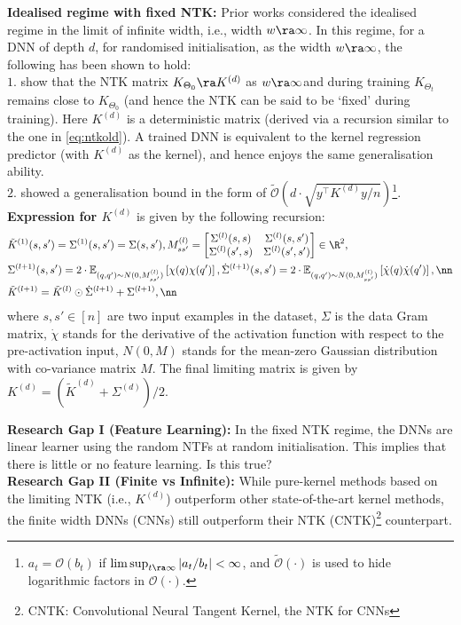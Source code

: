 \textbf{Idealised regime with fixed NTK:}
Prior works considered the idealised regime in the limit of infinite width, i.e., width $w\ra\infty$. In this regime, for a DNN of depth $d$, for randomised initialisation, as the width $w\ra\infty$, the following has been shown to hold:\\
$1.$ \cite{arora2019exact} show that the NTK matrix $K_{\Theta_0}\ra K^{(d)}$ as $w\ra\infty$and during training $K_{\Theta_t}$ remains close to $K_{\Theta_0}$ (and hence the NTK can be said to be `fixed' during training). Here $K^{(d)}$ is a deterministic matrix (derived via a recursion similar to the one in \eqref{eq:ntkold}). A trained DNN is equivalent to the kernel regression predictor (with $K^{(d)}$ as the kernel), and hence enjoys the same generalisation ability.\\
$2.$  \cite{cao2019generalization} showed a generalisation bound in the form of $\tilde{\mathcal{O}}\left(d\cdot\sqrt{y^\top K^{(d)} y/n}\right)$\footnote{$a_t=\mathcal{O}(b_t)$ if $\lim\sup_{t\ra\infty}|a_t/b_t|<\infty$, and $\tilde{\mathcal{O}}(\cdot)$ is used to hide logarithmic factors in $\mathcal{O}(\cdot)$.}.\\
\textbf{Expression for $K^{(d)}$} is given by the following recursion: 
\begin{align}\label{eq:ntkold}
&\tilde{K}^{(1)}(s,s')=\Sigma^{(1)}(s,s')=\Sigma(s,s'), M^{(l)}_{ss'}=\left[\begin{matrix}\Sigma^{(l)}(s,s) & \Sigma^{(l)}(s,s')\\ \Sigma^{(l)}(s',s) & \Sigma^{(l)}(s',s')\end{matrix}\right]\in \R^2,\\
&\Sigma^{(l+1)}(s,s')= 2\cdot\mathbb{E}_{(q,q')\sim N(0,M_{ss'}^{(l)})} \left[\chi(q)\chi(q')\right], \dot{\Sigma}^{(l+1)}(s,s')= 2\cdot\mathbb{E}_{(q,q')\sim N(0,M_{ss'}^{(l)})}\left[\dot{\chi}(q)\dot{\chi}(q')\right],\nn\\
&\tilde{K}^{(l+1)}=\tilde{K}^{(l)}\odot \dot{\Sigma}^{(l+1)}+\Sigma^{(l+1)},\nn
\end{align}
where $s,s'\in[n]$ are two input examples in the dataset, $\Sigma$ is the data Gram matrix, $\dot{\chi}$ stands for the derivative of the activation function with respect to the pre-activation input, $N(0,M)$ stands for the mean-zero Gaussian distribution with co-variance matrix $M$. The final limiting matrix is given by $K^{(d)}=\left(\tilde{K}^{(d)}+\Sigma^{(d)}\right)/2$. 

\textbf{Research Gap I (Feature Learning):} In the fixed NTK regime, the DNNs are linear learner using the random NTFs at random initialisation. This implies that there is little or no feature learning. Is this true?\\
\textbf{Research Gap II (Finite vs Infinite):} While pure-kernel methods based on the limiting NTK (i.e., $K^{(d)}$) outperform other state-of-the-art kernel methods, the finite width DNNs (CNNs) still outperform their NTK (CNTK)\footnote{CNTK: Convolutional Neural Tangent Kernel, the NTK for CNNs} counterpart.
